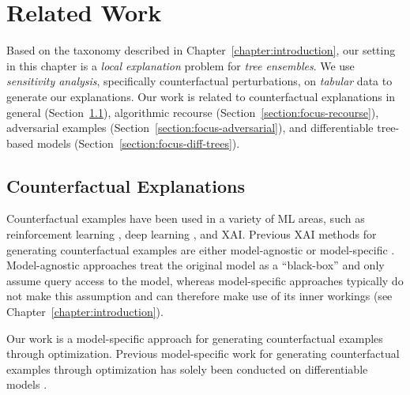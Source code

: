 
\section{Related Work}
\label{section:focus-related-work}
Based on the taxonomy described in Chapter~\ref{chapter:introduction}, our setting in this chapter is a \emph{local explanation} problem for \emph{tree ensembles}. 
We use \emph{sensitivity analysis}, specifically counterfactual perturbations, on \emph{tabular} data to generate our explanations. 
Our work is related to counterfactual explanations in general (Section~\ref{section:focus-cf}), algorithmic recourse (Section~\ref{section:focus-recourse}), adversarial examples (Section~\ref{section:focus-adversarial}), and differentiable tree-based models (Section~\ref{section:focus-diff-trees}).

\subsection{Counterfactual Explanations}
\label{section:focus-cf}
Counterfactual examples have been used in a variety of ML areas, such as reinforcement learning \citep{madumal_explainable_2019}, deep learning \citep{alaa_deep_2017}, and XAI. 
Previous XAI methods for generating counterfactual examples are either model-agnostic \citep{poyiadzi_face_2020, karimi_model-agnostic_2019, laugel_inverse_2017, van_looveren_interpretable_2020,  mothilal_explaining_2020} or model-specific \citep{wachter_counterfactual_2017, grath_interpretable_2018, tolomei_interpretable_2017, kanamori_dace_2020, russell_efficient_2019, dhurandhar_explanations_2018}. 
Model-agnostic approaches treat the original model as a ``black-box'' and only assume query access to the model, whereas model-specific approaches typically do not make this assumption and can therefore make use of its inner workings (see Chapter~\ref{chapter:introduction}). 

Our work is a model-specific approach for generating counterfactual examples through optimization. 
Previous model-specific work for generating counterfactual examples through optimization has solely been conducted on differentiable models \citep{wachter_counterfactual_2017, grath_interpretable_2018, dhurandhar_explanations_2018}. 

